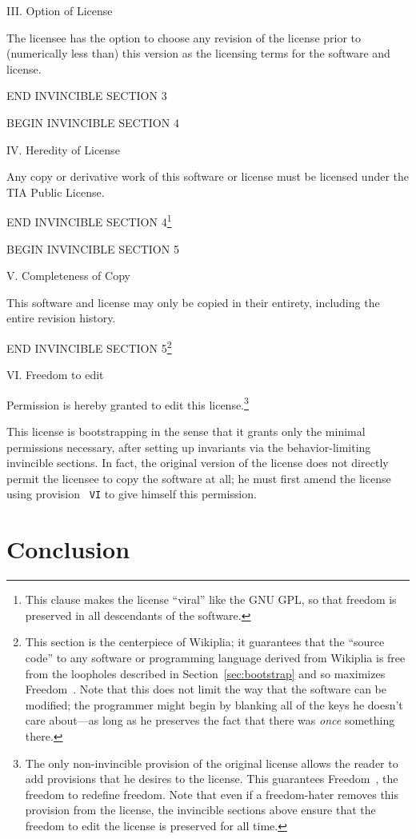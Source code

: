 \documentclass[twocolumn]{article}
\begin{document}
{III. Option of License

The licensee has the option to choose any revision of the license
prior to (numerically less than) this version as the licensing
terms for the software and license.

END INVINCIBLE SECTION 3

BEGIN INVINCIBLE SECTION 4

IV. Heredity of License

Any copy or derivative work of this software or license must be
licensed under the TIA Public License.

END INVINCIBLE SECTION 4\footnote{This clause makes the license
``viral'' like the GNU GPL, so that freedom is preserved in all
descendants of the software.}

BEGIN INVINCIBLE SECTION 5

V. Completeness of Copy

This software and license may only be copied in their entirety,
including the entire revision history.

END INVINCIBLE SECTION 5\footnote{This section is the centerpiece of
Wikiplia; it guarantees that the ``source code'' to any software or
programming language derived from Wikiplia is free from the loopholes
described in Section~\ref{sec:bootstrap} and so maximizes
Freedom~\ftinker. Note that this does not limit the way that the
software can be modified; the programmer might begin by blanking all
of the keys he doesn't care about---as long as he preserves the fact
that there was {\em once} something there.}

VI. Freedom to edit

Permission is hereby granted to edit this license.\footnote{The only
non-invincible provision of the original license allows the reader to
add provisions that he desires to the license. This guarantees
Freedom~\ffree, the freedom to redefine freedom.
%
Note that even if a freedom-hater removes this provision from the
license, the invincible sections above ensure that the freedom to edit
the license is preserved for all time.}

}

\bigskip
This license is bootstrapping in the sense that it grants only the
minimal permissions necessary, after setting up invariants via the
behavior-limiting invincible sections. In fact, the original version
of the license does not directly permit the licensee to copy the
software at all; he must first amend the license using provision {\tt
VI} to give himself this permission.

\section{Conclusion} \label{sec:conc}

\end{document}
